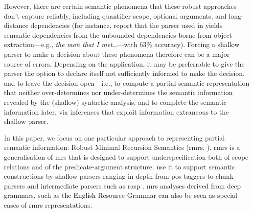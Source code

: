 However, there are certain semantic
phenomena that these robust
approaches don't capture reliably, including quantifier scope, optional
arguments,
% 
and long-distance dependencies (for instance, \cite{clark:etal:2004}
report that the parser used in \cite{bos:etal:2004} 
yields semantic dependencies from the unbounded
dependencies borne from
object extraction---e.g., {\em the man that I met\dots}---with 63\%
accuracy).
Forcing a shallow parser
to make a decision about these phenomena therefore can be a major source
of errors.  Depending on the application, it may be preferrable to
give the parser the option to 
declare itself not sufficiently informed to make the decision, and
to leave the decision open---i.e., to compute a partial semantic
representation that neither over-determines nor under-determines the
semantic information revealed by the (shallow) syntactic analysis, and
to complete the semantic information later, via inferences that
exploit information extraneous to the shallow parser.

In this paper, we focus on one particular approach to representing
partial semantic information:
Robust Minimal Recursion Semantics ({\sc rmrs},
\cite{copestake:2003}).  {\sc rmrs} is a generalisation of {\sc mrs}
\cite{copestake:etal:2005} that is designed to support underspecification both
of scope relations and of the predicate-argument structure.
\cite{copestake:2003,frank:2004} use it to
support semantic constructions by shallow parsers
ranging in depth from {\sc pos} taggers to chunk parsers  
and intermediate parsers such as {\sc rasp}
\cite{briscoe:etal:2006}.  {\sc mrs} analyses
derived from deep grammars, such as the English Resource Grammar
\cite{copestake:flickinger:2000} can also be seen as special cases of
{\sc rmrs} representations.

